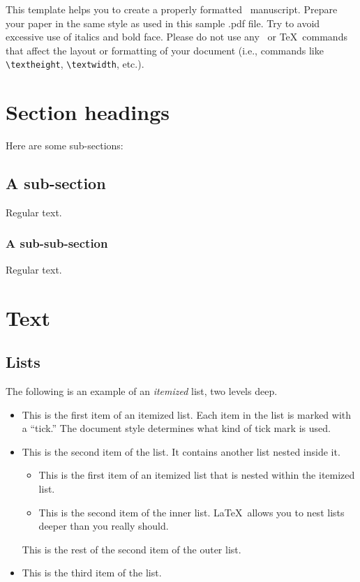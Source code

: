 \documentclass[aoas,preprint]{imsart}
\theoremstyle{remark}
\begin{document}
This template helps you to create a properly formatted \LaTeXe\ manuscript.
Prepare your paper in the same style as used in this sample .pdf file.
Try to avoid excessive use of italics and bold face.
Please do not use any \LaTeXe\ or \TeX\ commands that affect the layout
or formatting of your document (i.e., commands like \verb|\textheight|,
\verb|\textwidth|, etc.).

\section{Section headings}
Here are some sub-sections:
\subsection{A sub-section}
Regular text.
\subsubsection{A sub-sub-section}
Regular text.

\section{Text}
\subsection{Lists}

The following is an example of an \emph{itemized} list,
two levels deep.
\begin{itemize}
\item
This is the first item of an itemized list.  Each item
in the list is marked with a ``tick.''  The document
style determines what kind of tick mark is used.
\item
This is the second item of the list.  It contains another
list nested inside it.
\begin{itemize}
\item This is the first item of an itemized list that
is nested within the itemized list.
\item This is the second item of the inner list.  \LaTeX\
allows you to nest lists deeper than you really should.
\end{itemize}
This is the rest of the second item of the outer list.
\item
This is the third item of the list.
\end{itemize}
\end{document}
